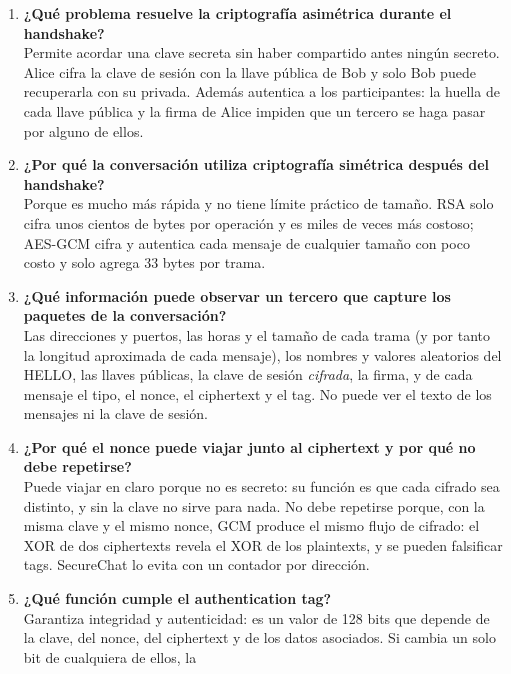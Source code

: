 \documentclass[11pt,a4paper]{article}
\theoremstyle{definition}
\theoremstyle{remark}
\begin{document}
\begin{enumerate}[itemsep=6pt]
  \item \textbf{¿Qué problema resuelve la criptografía asimétrica durante el handshake?}\\
        Permite acordar una clave secreta sin haber compartido antes ningún
        secreto. Alice cifra la clave de sesión con la llave pública de Bob y
        solo Bob puede recuperarla con su privada. Además autentica a los
        participantes: la huella de cada llave pública y la firma de Alice
        impiden que un tercero se haga pasar por alguno de ellos.
  \item \textbf{¿Por qué la conversación utiliza criptografía simétrica después del handshake?}\\
        Porque es mucho más rápida y no tiene límite práctico de tamaño. RSA
        solo cifra unos cientos de bytes por operación y es miles de veces
        más costoso; AES-GCM cifra y autentica cada mensaje de cualquier
        tamaño con poco costo y solo agrega 33 bytes por trama.
  \item \textbf{¿Qué información puede observar un tercero que capture los paquetes de la conversación?}\\
        Las direcciones y puertos, las horas y el tamaño de cada trama (y por
        tanto la longitud aproximada de cada mensaje), los nombres y valores
        aleatorios del HELLO, las llaves públicas, la clave de sesión
        \emph{cifrada}, la firma, y de cada mensaje el tipo, el nonce, el
        ciphertext y el tag. No puede ver el texto de los mensajes ni la
        clave de sesión.
  \item \textbf{¿Por qué el nonce puede viajar junto al ciphertext y por qué no debe repetirse?}\\
        Puede viajar en claro porque no es secreto: su función es que cada
        cifrado sea distinto, y sin la clave no sirve para nada. No debe
        repetirse porque, con la misma clave y el mismo nonce, GCM produce el
        mismo flujo de cifrado: el XOR de dos ciphertexts revela el XOR de los
        plaintexts, y se pueden falsificar tags. SecureChat lo evita con un
        contador por dirección.
  \item \textbf{¿Qué función cumple el authentication tag?}\\
        Garantiza integridad y autenticidad: es un valor de 128 bits que
        depende de la clave, del nonce, del ciphertext y de los datos
        asociados. Si cambia un solo bit de cualquiera de ellos, la

\end{enumerate}
\end{document}
